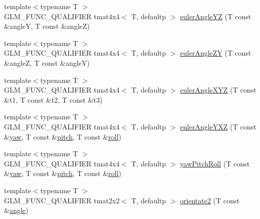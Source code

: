 \begin{DoxyCompactItemize}
\item 
{\footnotesize template$<$typename T $>$ }\\G\+L\+M\+\_\+\+F\+U\+N\+C\+\_\+\+Q\+U\+A\+L\+I\+F\+I\+E\+R tmat4x4$<$ T, defaultp $>$ \hyperlink{group__gtx__euler__angles_ga1033f84f51d61646145352ef0c1bb58c}{euler\+Angle\+Y\+Z} (T const \&angle\+Y, T const \&angle\+Z)
\item 
{\footnotesize template$<$typename T $>$ }\\G\+L\+M\+\_\+\+F\+U\+N\+C\+\_\+\+Q\+U\+A\+L\+I\+F\+I\+E\+R tmat4x4$<$ T, defaultp $>$ \hyperlink{group__gtx__euler__angles_ga02f037926568bbd12dfece3b28b20343}{euler\+Angle\+Z\+Y} (T const \&angle\+Z, T const \&angle\+Y)
\item 
{\footnotesize template$<$typename T $>$ }\\G\+L\+M\+\_\+\+F\+U\+N\+C\+\_\+\+Q\+U\+A\+L\+I\+F\+I\+E\+R tmat4x4$<$ T, defaultp $>$ \hyperlink{group__gtx__euler__angles_gaaedda1657a1aebe0a904d864b33844e8}{euler\+Angle\+X\+Y\+Z} (T const \&t1, T const \&t2, T const \&t3)
\item 
{\footnotesize template$<$typename T $>$ }\\G\+L\+M\+\_\+\+F\+U\+N\+C\+\_\+\+Q\+U\+A\+L\+I\+F\+I\+E\+R tmat4x4$<$ T, defaultp $>$ \hyperlink{group__gtx__euler__angles_ga0242b5ab68651db70c6025815549427f}{euler\+Angle\+Y\+X\+Z} (T const \&\hyperlink{group__gtc__quaternion_ga724a5df282b70cec0a6cb0d6dcddb6d6}{yaw}, T const \&\hyperlink{group__gtc__quaternion_ga2c08b93a4261c10748fd4d2104346f17}{pitch}, T const \&\hyperlink{group__gtc__quaternion_ga4fd705376c6c1fd667be0055a0ea58ec}{roll})
\item 
{\footnotesize template$<$typename T $>$ }\\G\+L\+M\+\_\+\+F\+U\+N\+C\+\_\+\+Q\+U\+A\+L\+I\+F\+I\+E\+R tmat4x4$<$ T, defaultp $>$ \hyperlink{group__gtx__euler__angles_gaf9c8d0f1df88c5344165600774489bc5}{yaw\+Pitch\+Roll} (T const \&\hyperlink{group__gtc__quaternion_ga724a5df282b70cec0a6cb0d6dcddb6d6}{yaw}, T const \&\hyperlink{group__gtc__quaternion_ga2c08b93a4261c10748fd4d2104346f17}{pitch}, T const \&\hyperlink{group__gtc__quaternion_ga4fd705376c6c1fd667be0055a0ea58ec}{roll})
\item 
{\footnotesize template$<$typename T $>$ }\\G\+L\+M\+\_\+\+F\+U\+N\+C\+\_\+\+Q\+U\+A\+L\+I\+F\+I\+E\+R tmat2x2$<$ T, defaultp $>$ \hyperlink{group__gtx__euler__angles_ga6f465681cbbc575ad93a53ec918dacf3}{orientate2} (T const \&\hyperlink{group__gtc__quaternion_gad4a4448baedb198b2b1e7880d2544dc9}{angle})
\item 

\end{DoxyCompactItemize}
